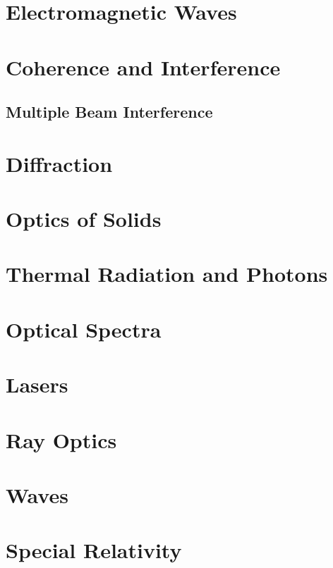 \documentclass{book}
\theoremstyle{definition}
\theoremstyle{remark}
\begin{document}
\chapter{Electromagnetic Waves}

\chapter{Coherence and Interference}
\section{Multiple Beam Interference}
\chapter{Diffraction}
\chapter{Optics of Solids}
\chapter{Thermal Radiation and Photons}
\chapter{Optical Spectra}
\chapter{Lasers}
\chapter{Ray Optics}
\appendix
\begin{comment}
\chapter{Electric Circuits}
\section{Electronics}
\section{DC Current}
\section{AC Current}
\chapter{Magnetic Circuits}
\end{comment}
\chapter{Waves}

\chapter{Special Relativity}

\nocite{griffem,jackson,landau2,zangwillem,fowles}
\printbibliography
\end{document}

